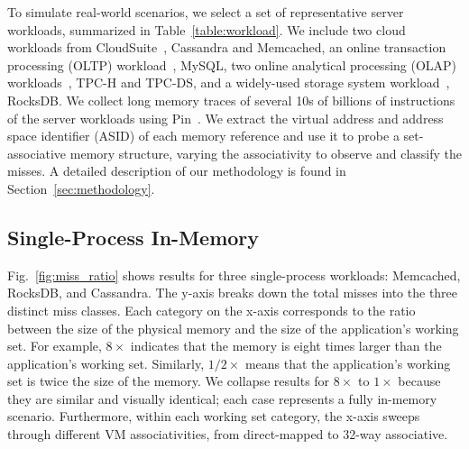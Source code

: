 To simulate real-world scenarios, we select a set of representative server workloads, summarized in Table~\ref{table:workload}. We include two cloud workloads from CloudSuite~\cite{ferdman:clearing}, Cassandra and Memcached, an online transaction processing (OLTP) workload~\cite{facebook:linkbench}, MySQL, two online analytical processing (OLAP) workloads~\cite{boncz:breaking}, TPC-H and TPC-DS, and a widely-used storage system workload~\cite{dong:optimizing}, RocksDB. We collect long memory traces of several 10s of billions of instructions of the server workloads using Pin~\cite{luk:pin}. We extract the virtual address and address space identifier (ASID) of each memory reference and use it to probe a set-associative memory structure, varying the associativity to observe and classify the misses. A detailed description of our methodology is found in Section~\ref{sec:methodology}.

\subsection{Single-Process In-Memory}

Fig.~\ref{fig:miss_ratio} shows results for three single-process workloads: Memcached, RocksDB, and Cassandra. The y-axis breaks down the total misses into the three distinct miss classes. Each category on the x-axis corresponds to the ratio between the size of the physical memory and the size of the application's working set. For example,  $8\times$ indicates that the memory is eight times larger than the application's working set. Similarly, $1/2\times$ means that the application's working set is twice the size of the memory. We collapse results for $8\times$ to $1\times$ because they are similar and visually identical; each case represents a fully in-memory scenario. Furthermore, within each working set category, the x-axis sweeps through different VM associativities, from direct-mapped to 32-way associative. 

